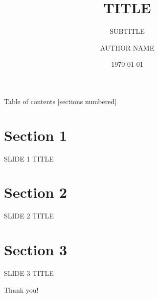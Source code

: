 \documentclass[10pt,xcolor={dvipsnames},aspectratio=169]{beamer}
\title{TITLE}
\subtitle{SUBTITLE}
\date{\today}
\author{AUTHOR NAME}
\institute{INSTITUTE}
\begin{document}
\maketitle

\begin{frame}{Table of contents}
  [sections numbered]
  \tableofcontents%
\end{frame}

\section{Section 1}

\begin{frame}{SLIDE 1 TITLE}
\end{frame}

\section{Section 2}

\begin{frame}{SLIDE 2 TITLE}
\end{frame}

\section{Section 3}

\begin{frame}{SLIDE 3 TITLE}
\end{frame}

\begin{frame}[standout]
Thank you!
\end{frame}



%  

\end{document}
